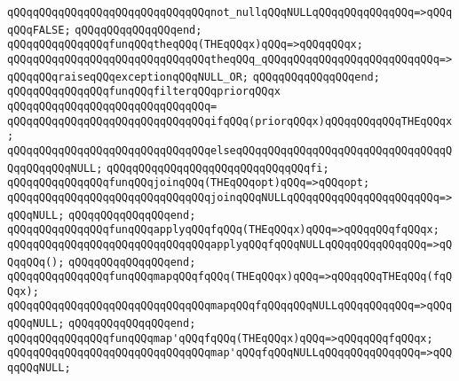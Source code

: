 \verb|qQQqqQQqqQQqqQQqqQQqqQQqqQQqqQQqnot_nullqQQqNULLqQQqqQQqqQQqqQQq=>qQQqqQQqFALSE;|\newline
\verb|qQQqqQQqqQQqqQQqend;|\newline
\newline
\verb|qQQqqQQqqQQqqQQqfunqQQqtheqQQq(THEqQQqx)qQQq=>qQQqqQQqx;|\newline
\verb|qQQqqQQqqQQqqQQqqQQqqQQqqQQqqQQqtheqQQq_qQQqqQQqqQQqqQQqqQQqqQQqqQQq=>qQQqqQQqraiseqQQqexceptionqQQqNULL_OR;|\newline
\verb|qQQqqQQqqQQqqQQqend;|\newline
\newline
\verb|qQQqqQQqqQQqqQQqfunqQQqfilterqQQqpriorqQQqx|\newline
\verb|qQQqqQQqqQQqqQQqqQQqqQQqqQQqqQQq=|\newline
\verb|qQQqqQQqqQQqqQQqqQQqqQQqqQQqqQQqifqQQq(priorqQQqx)qQQqqQQqqQQqTHEqQQqx;|\newline
\verb|qQQqqQQqqQQqqQQqqQQqqQQqqQQqqQQqelseqQQqqQQqqQQqqQQqqQQqqQQqqQQqqQQqqQQqqQQqqQQqNULL;|\newline
\verb|qQQqqQQqqQQqqQQqqQQqqQQqqQQqqQQqfi;|\newline
\newline
\verb|qQQqqQQqqQQqqQQqfunqQQqjoinqQQq(THEqQQqopt)qQQq=>qQQqopt;|\newline
\verb|qQQqqQQqqQQqqQQqqQQqqQQqqQQqqQQqjoinqQQqNULLqQQqqQQqqQQqqQQqqQQqqQQq=>qQQqNULL;|\newline
\verb|qQQqqQQqqQQqqQQqend;|\newline
\newline
\verb|qQQqqQQqqQQqqQQqfunqQQqapplyqQQqfqQQq(THEqQQqx)qQQq=>qQQqqQQqfqQQqx;|\newline
\verb|qQQqqQQqqQQqqQQqqQQqqQQqqQQqqQQqapplyqQQqfqQQqNULLqQQqqQQqqQQqqQQq=>qQQqqQQq();|\newline
\verb|qQQqqQQqqQQqqQQqend;|\newline
\newline
\verb|qQQqqQQqqQQqqQQqfunqQQqmapqQQqfqQQq(THEqQQqx)qQQq=>qQQqqQQqTHEqQQq(fqQQqx);|\newline
\verb|qQQqqQQqqQQqqQQqqQQqqQQqqQQqqQQqmapqQQqfqQQqqQQqNULLqQQqqQQqqQQq=>qQQqqQQqNULL;|\newline
\verb|qQQqqQQqqQQqqQQqend;|\newline
\newline
\verb|qQQqqQQqqQQqqQQqfunqQQqmap'qQQqfqQQq(THEqQQqx)qQQq=>qQQqqQQqfqQQqx;|\newline
\verb|qQQqqQQqqQQqqQQqqQQqqQQqqQQqqQQqmap'qQQqfqQQqNULLqQQqqQQqqQQqqQQq=>qQQqqQQqNULL;|\newline
